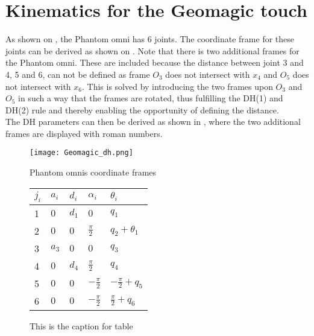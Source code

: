 \section{Kinematics for the Geomagic touch}

As shown on , the Phantom omni has 6 joints. The coordinate frame for these joints can be derived as shown on . Note that there is two additional frames for the Phantom omni. These are included because the distance between joint 3 and 4, 5 and 6, can not be defined as frame $O_3$ does not intersect with $x_4$ and $O_5$ does not intersect with $x_6$. This is solved by introducing the two frames upon $O_3$ and $O_5$ in such a way that the frames are rotated, thus fulfilling the DH(1) and DH(2) rule and thereby enabling the opportunity of defining the distance. \\
The \gls{DH} parameters can then be derived as shown in , where the two additional frames are displayed with roman numbers.


\begin{figure}[H]
\centering
\begin{minipage}[H]{.65\textwidth}
\centering
\vspace{0pt}
\texttt{[image: Geomagic\_dh.png]}
\caption{Phantom omnis coordinate frames}
\label{fig:Frame_phantom}
\end{minipage}\hfill
\begin{minipage}[H]{.35\textwidth}
\centering
\vspace{95pt}
\begin{tabular}{|l|l|l|l|l|}
\hline
 $j_i$ 	  & $a_i$    & $d_i$ & $\alpha_i$ 		 & $\theta_i$ 			 \\ \hline
 1  	  &  $0$     & $d_1$ & $0$	 & $q_1$ 			     \\ \hline
 2  	  &  $0$   & $0$ 	 & $\frac{\pi}{2}$ 		 		 & $q_2 + \theta_1$ 	 \\ \hline
 3  	  &  $a_3$	 & $0$ & $0$ 		 		 & $q_3$ 					 \\ \hline
 4  	  &  $0$	 & $d_4$ & $\frac{\pi}{2}$ 	 & $q_4$ 			 \\ \hline
 5  	  &  $0$	 & $0$ & $-\frac{\pi}{2}$ 		 		 & $-\frac{\pi}{2} + q_5$ 	 				 \\ \hline
 6  	  &  $0$	 & $0$ & $-\frac{\pi}{2}$ 		 & $\frac{\pi}{2}+q_6$ 				 \\ \hline
\end{tabular}
\vspace{0pt}
\caption{This is the caption for table}
\label{tab:kin_geo}
\end{minipage}
\end{figure}







